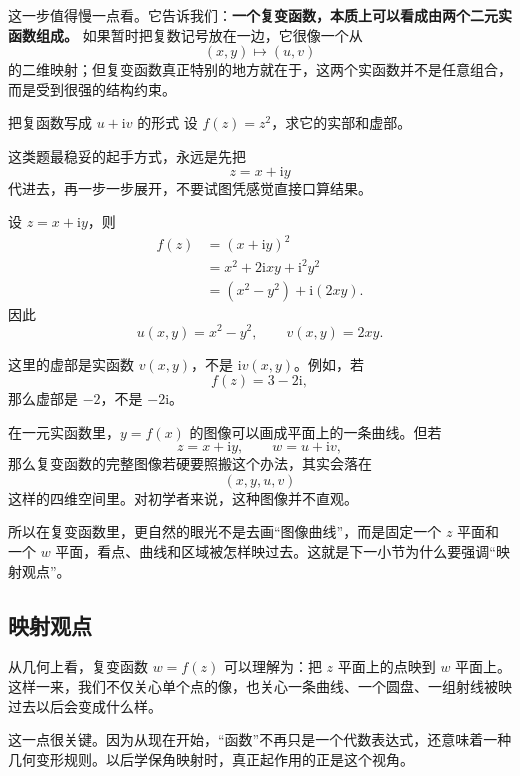 这一步值得慢一点看。它告诉我们：\textbf{一个复变函数，本质上可以看成由两个二元实函数组成。} 如果暂时把复数记号放在一边，它很像一个从
\[
    (x,y)\longmapsto (u,v)
\]
的二维映射；但复变函数真正特别的地方就在于，这两个实函数并不是任意组合，而是受到很强的结构约束。

\begin{lizi}{把复函数写成 $u+\mathrm{i}v$ 的形式}{}
设 $f(z)=z^2$，求它的实部和虚部。

\begin{jie}
这类题最稳妥的起手方式，永远是先把
\[
z=x+\mathrm{i}y
\]
代进去，再一步一步展开，不要试图凭感觉直接口算结果。

设 $z=x+\mathrm{i}y$，则
\begin{align*}
    f(z)&=(x+\mathrm{i}y)^2\\
        &=x^2+2\mathrm{i}xy+\mathrm{i}^2y^2\\
        &=(x^2-y^2)+\mathrm{i}(2xy).
\end{align*}
因此
\[
    u(x,y)=x^2-y^2,\qquad v(x,y)=2xy.
\]
\end{jie}
\end{lizi}

\begin{jinshi}[一个最容易出错的小地方]
这里的虚部是实函数 $v(x,y)$，不是 $\mathrm{i}v(x,y)$。例如，若
\[
    f(z)=3-2\mathrm{i},
\]
那么虚部是 $-2$，不是 $-2\mathrm{i}$。
\end{jinshi}

\begin{tishi}[为什么不能再像高等数学那样画函数图像]
在一元实函数里，$y=f(x)$ 的图像可以画成平面上的一条曲线。但若
\[
    z=x+\mathrm{i}y,\qquad w=u+\mathrm{i}v,
\]
那么复变函数的完整图像若硬要照搬这个办法，其实会落在
\[
    (x,y,u,v)
\]
这样的四维空间里。对初学者来说，这种图像并不直观。

所以在复变函数里，更自然的眼光不是去画``图像曲线''，而是固定一个 $z$ 平面和一个 $w$ 平面，看点、曲线和区域被怎样映过去。这就是下一小节为什么要强调``映射观点''。
\end{tishi}

\subsection{映射观点}

从几何上看，复变函数 $w=f(z)$ 可以理解为：把 $z$ 平面上的点映到 $w$ 平面上。这样一来，我们不仅关心单个点的像，也关心一条曲线、一个圆盘、一组射线被映过去以后会变成什么样。

这一点很关键。因为从现在开始，``函数''不再只是一个代数表达式，还意味着一种几何变形规则。以后学保角映射时，真正起作用的正是这个视角。

